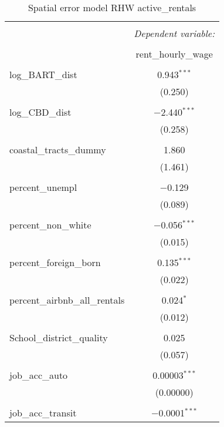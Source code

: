 \documentclass[10pt, letterpaper]{amsart}
\begin{document}
\begin{table}[H] \centering 
  \caption{Spatial error model RHW active\_rentals} 
  \label{} 
  \begin{tabular}{@{\extracolsep{5pt}}lc} 
    \\[-1.8ex]\hline 
    \hline \\[-1.8ex] 
    & \multicolumn{1}{c}{\textit{Dependent variable:}} \\ 
    \cline{2-2} 
    \\[-1.8ex] & rent\_hourly\_wage \\ 
    \hline \\[-1.8ex] 
    log\_BART\_dist & 0.943$^{***}$ \\ 
    & (0.250) \\ 
    & \\ 
    log\_CBD\_dist & $-$2.440$^{***}$ \\ 
    & (0.258) \\ 
    & \\ 
    coastal\_tracts\_dummy & 1.860 \\ 
    & (1.461) \\ 
    & \\ 
    percent\_unempl & $-$0.129 \\ 
    & (0.089) \\ 
    & \\ 
    percent\_non\_white & $-$0.056$^{***}$ \\ 
    & (0.015) \\ 
    & \\ 
    percent\_foreign\_born & 0.135$^{***}$ \\ 
    & (0.022) \\ 
    & \\ 
    percent\_airbnb\_all\_rentals & 0.024$^{*}$ \\ 
    & (0.012) \\ 
    & \\ 
    School\_district\_quality & 0.025 \\ 
    & (0.057) \\ 
    & \\ 
    job\_acc\_auto & 0.00003$^{***}$ \\ 
    & (0.00000) \\ 
    & \\ 
    job\_acc\_transit & $-$0.0001$^{***}$ \\ 

\end{tabular}
\end{table}
\end{document}
